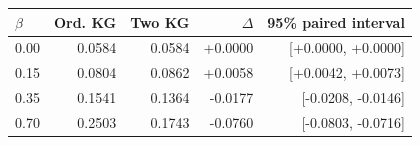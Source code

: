\begin{tabular}{lrrrr}
\toprule
$\beta$ & Ord. KG & Two KG & $\Delta$ & 95\% paired interval \\
\midrule
0.00 & 0.0584 & 0.0584 & +0.0000 & [+0.0000, +0.0000] \\
0.15 & 0.0804 & 0.0862 & +0.0058 & [+0.0042, +0.0073] \\
0.35 & 0.1541 & 0.1364 & -0.0177 & [-0.0208, -0.0146] \\
0.70 & 0.2503 & 0.1743 & -0.0760 & [-0.0803, -0.0716] \\
\bottomrule
\end{tabular}
